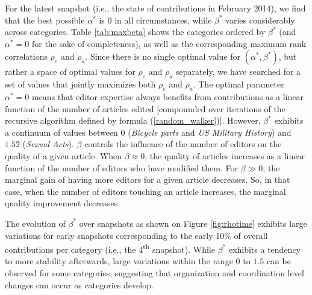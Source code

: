 
For the latest snapshot (i.e., the state of contributions in February 2014), we find that the best possible $\alpha^*$ is $0$ in all circumstances, while $\beta^*$ varies considerably across categories. Table \ref{tab:maxbeta} shows the categories ordered by $\beta^*$ (and $\alpha^*=0$ for the sake of completeness), as well as the corresponding maximum rank correlations $\rho_e$ and $\rho_a$. Since there is no single optimal value for $(\alpha^*,\beta^*)$, but rather a space of optimal values for  $\rho_e$ and $\rho_a$ separately, we have searched for a set of values that jointly maximizes both $\rho_e$ and $\rho_a$. The optimal parameter $\alpha^* = 0$ means that editor expertise always benefits from contributions as a linear function of the number of articles edited [compounded over iterations of the recursive algorithm defined by formula (\ref{random_walker})].  However, $\beta^*$ exhibits a continuum of values between $0$ ({\it Bicycle parts} and {\it US Military History}) and $1.52$ ({\it Sexual Acts}). $\beta$ controls the influence of the number of editors on the quality of a given article. When $\beta \approx 0$, the quality of articles increases as a linear function of the number of editors who have modified them. For $\beta \gg 0$, the marginal gain of having more editors for a given article decreases. So, in that case, when the number of editors touching an article increases, the marginal quality improvement decreases.

The evolution of $\beta^{*}$ over snapshots as shown on Figure \ref{fig:rhotime} exhibits large variations for early snapshots corresponding to the early 10\% of overall contributions per category (i.e., the 4\textsuperscript{th} snapshot). While $\beta^{*}$ exhibits a tendency to more stability afterwards, large variations within the range $0$ to $1.5$ can be observed for some categories, suggesting that organization and coordination level changes can occur as categories develop. 

